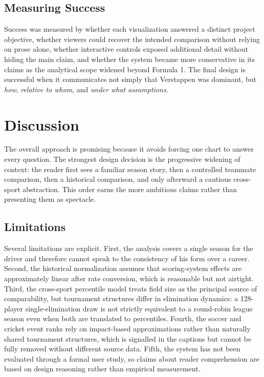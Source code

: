 \documentclass[conference]{IEEEtran}
\begin{document}
\subsection{Measuring Success}
Success was measured by whether each visualization answered a distinct project objective, whether viewers could recover the intended comparison without relying on prose alone, whether interactive controls exposed additional detail without hiding the main claim, and whether the system became more conservative in its claims as the analytical scope widened beyond Formula 1. The final design is successful when it communicates not simply that Verstappen was dominant, but \emph{how}, \emph{relative to whom}, and \emph{under what assumptions}.

\section{Discussion}
The overall approach is promising because it avoids forcing one chart to answer every question. The strongest design decision is the progressive widening of context: the reader first sees a familiar season story, then a controlled teammate comparison, then a historical comparison, and only afterward a cautious cross-sport abstraction. This order earns the more ambitious claims rather than presenting them as spectacle.

\subsection{Limitations}
Several limitations are explicit. First, the analysis covers a single season for the driver and therefore cannot speak to the consistency of his form over a career. Second, the historical normalization assumes that scoring-system effects are approximately linear after rate conversion, which is reasonable but not airtight. Third, the cross-sport percentile model treats field size as the principal source of comparability, but tournament structures differ in elimination dynamics: a 128-player single-elimination draw is not strictly equivalent to a round-robin league season even when both are translated to percentiles. Fourth, the soccer and cricket event ranks rely on impact-based approximations rather than naturally shared tournament structures, which is signalled in the captions but cannot be fully removed without different source data. Fifth, the system has not been evaluated through a formal user study, so claims about reader comprehension are based on design reasoning rather than empirical measurement.
\end{document}
